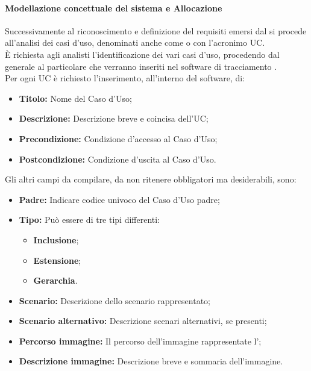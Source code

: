     \paragraph{Modellazione concettuale del sistema e Allocazione}
      Successivamente al riconoscimento e definizione del requisiti emersi dal  si procede all'analisi dei casi d'uso, denominati anche come
       o con l'acronimo UC.\\
      È richiesta agli analisti l'identificazione dei vari casi d'uso, procedendo dal generale al particolare che verranno inseriti nel software di tracciamento
      \textbf{}.\\
      Per ogni UC è richiesto l'inserimento, all'interno del software, di:
      \begin{itemize}
        \item \textbf{Titolo: }Nome del Caso d'Uso;
        \item \textbf{Descrizione: }Descrizione breve e coincisa dell'UC;
        \item \textbf{Precondizione: }Condizione d'accesso al Caso d'Uso;
        \item \textbf{Postcondizione: }Condizione d'uscita al Caso d'Uso.
      \end{itemize}
      Gli altri campi da compilare, da non ritenere obbligatori ma desiderabili, sono:
      \begin{itemize}
        \item \textbf{Padre: }Indicare codice univoco del Caso d'Uso padre;
        \item \textbf{Tipo: }Può essere di tre tipi differenti:
        \bgroup
          \begin{itemize}
            \item \textbf{Inclusione};
            \item \textbf{Estensione};
            \item \textbf{Gerarchia}.
          \end{itemize}
        \egroup
        \item \textbf{Scenario: }Descrizione dello scenario rappresentato;
        \item \textbf{Scenario alternativo: }Descrizione scenari alternativi, se presenti;
        \item \textbf{Percorso immagine: }Il percorso dell'immagine rappresentate l';
        \item \textbf{Descrizione immagine: }Descrizione breve e sommaria dell'immagine.
      \end{itemize}
